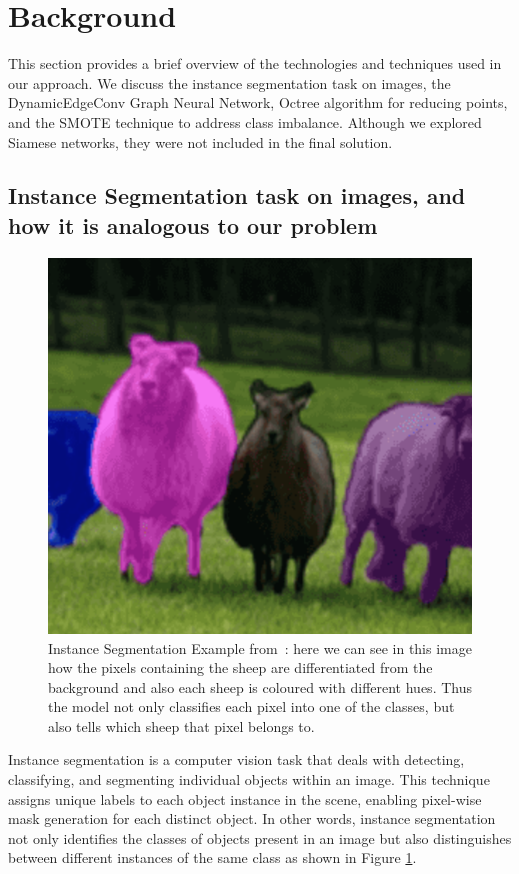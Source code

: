 \section{Background}

This section provides a brief overview of the technologies and techniques used in our approach. We discuss the instance segmentation task on images, the DynamicEdgeConv Graph Neural Network, Octree algorithm for reducing points, and the SMOTE technique to address class imbalance. Although we explored Siamese networks, they were not included in the final solution.

\subsection{Instance Segmentation task on images, and how it is analogous to our problem} \label{ssec:intseg}

    \begin{figure}
        \centering
        \includegraphics[width=0.75\linewidth]{images/instance_seg_example.png}
        \caption{Instance Segmentation Example from~\cite{intsegimg}: here we can see in this image how the pixels containing the sheep are differentiated from the background and also each sheep is coloured with different hues. Thus the model not only classifies each pixel into one of the classes, but also tells which sheep that pixel belongs to.}
        \label{fig:intseg}
    \end{figure}

    Instance segmentation is a computer vision task that deals with detecting, classifying, and segmenting individual objects within an image. This technique assigns unique labels to each object instance in the scene, enabling pixel-wise mask generation for each distinct object. In other words, instance segmentation not only identifies the classes of objects present in an image but also distinguishes between different instances of the same class as shown in Figure \ref{fig:intseg}.

